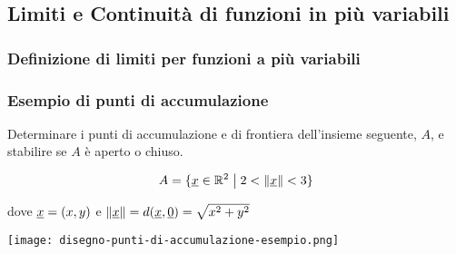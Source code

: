 \subsection{Limiti e Continuità di funzioni in più variabili}

\subsubsection{Definizione di limiti per funzioni a più variabili}



\filbreak{}

\subsubsection*{Esempio di punti di accumulazione}

Determinare i punti di accumulazione e di frontiera dell'insieme seguente, \(A\), e stabilire se \(A\) è aperto o chiuso.

\[
    A = \{\underline{x} \in \mathbb{R}^{2} \;\big|\; 2 < \left\lVert\underline{x}\right\rVert < 3 \}
\]

dove \(\underline{x}=(x,y)\) e \(\left\lVert\underline{x}\right\rVert = d(\underline{x},\underline{0}) = \sqrt{x^{2}+y^{2}}\)
\begin{center}
    \texttt{[image: disegno-punti-di-accumulazione-esempio.png]}
\end{center}

\filbreak{}

